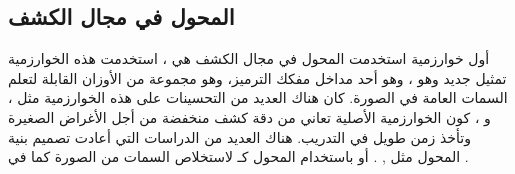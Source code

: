 \subsection{المحول في مجال الكشف}
أول خوارزمية استخدمت المحول في مجال الكشف هي 
،
استخدمت هذه الخوارزمية تمثيل جديد وهو
،
وهو أحد مداخل مفكك الترميز،
وهو مجموعة من الأوزان القابلة لتعلم السمات العامة في الصورة. كان هناك العديد من التحسينات على هذه الخوارزمية مثل
،
و
،
كون الخوارزمية الأصلية
تعاني من دقة كشف منخفضة من أجل الأغراض الصغيرة وتأخذ زمن طويل في التدريب.
\newline
هناك العديد من الدراسات التي أعادت تصميم بنية المحول مثل
,
.
أو باستخدام المحول كـ
لاستخلاص السمات من الصورة كما في
.
